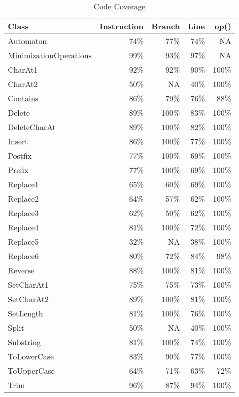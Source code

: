 \documentclass[letterpaper,sigplan]{acmart}
\begin{document}
\begin{table}[ht]
  {\scriptsize
    \begin{tabular}{lrrrr}
      \toprule
      \bf{Class} & \bf{Instruction} & \bf{Branch} & \bf{Line} & \bf{op()} \\
      \midrule
      Automaton & 74\% & 77\% & 74\% & NA \\
      \midrule
      MinimizationOperations & 99\% & 93\% & 97\% & NA \\
      \midrule
      CharAt1 & 92\% & 92\% & 90\% & 100\% \\
      \midrule
      CharAt2 & 50\% & NA & 40\% & 100\% \\
      \midrule
      Contains & 86\% & 79\% & 76\% & 88\% \\
      \midrule
      Delete & 89\% & 100\% & 83\% & 100\% \\
      \midrule
      DeleteCharAt & 89\% & 100\% & 82\% & 100\% \\
      \midrule
      Insert & 86\% & 100\% & 77\% & 100\% \\
      \midrule
      Postfix & 77\% & 100\% & 69\% & 100\% \\
      \midrule
      Prefix & 77\% & 100\% & 69\% & 100\% \\
      \midrule
      Replace1 & 65\% & 60\% & 69\% & 100\% \\
      \midrule
      Replace2 & 64\% & 57\% & 62\% & 100\% \\
      \midrule
      Replace3 & 62\% & 50\% & 62\% & 100\% \\
      \midrule
      Replace4 & 81\% & 100\% & 72\% & 100\% \\
      \midrule
      Replace5 & 32\% & NA & 38\% & 100\% \\
      \midrule
      Replace6 & 80\% & 72\% & 84\% & 98\% \\
      \midrule
      Reverse & 88\% & 100\% & 81\% & 100\% \\
      \midrule
      SetCharAt1 & 75\% & 75\% & 73\% & 100\% \\
      \midrule
      SetCharAt2 & 89\% & 100\% & 81\% & 100\% \\
      \midrule
      SetLength & 81\% & 100\% & 76\% & 100\% \\
      \midrule
      Split & 50\% & NA & 40\% & 100\% \\
      \midrule
      Substring & 81\% & 100\% & 74\% & 100\% \\
      \midrule
      ToLowerCase & 83\% & 90\% & 77\% & 100\% \\
      \midrule
      ToUpperCase & 64\% & 71\% & 63\% & 72\% \\
      \midrule
      Trim & 96\% & 87\% & 94\% & 100\% \\
      \bottomrule
    \end{tabular}
  }
  \caption{Code Coverage}%
  \label{tab:code-coverage}
\end{table}
\end{document}
